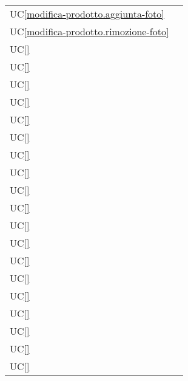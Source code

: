 \begin{longtable}{C{6cm} C{6cm}}
    UC\ref{modifica-prodotto.aggiunta-foto} &  \\

	UC\ref{modifica-prodotto.rimozione-foto} &  \\

    UC\ref{} &  \\

	UC\ref{} &  \\

    UC\ref{} &  \\

    UC\ref{} &  \\

	UC\ref{} &  \\

    UC\ref{} &  \\

	UC\ref{} &  \\

    UC\ref{} &  \\

	UC\ref{} &  \\

    UC\ref{} &  \\

	UC\ref{} &  \\

    UC\ref{} &  \\

	UC\ref{} &  \\

    UC\ref{} &  \\

	UC\ref{} &  \\

    UC\ref{} &  \\

	UC\ref{} &  \\

    UC\ref{} &  \\

	UC\ref{} &  \\


\end{longtable}
